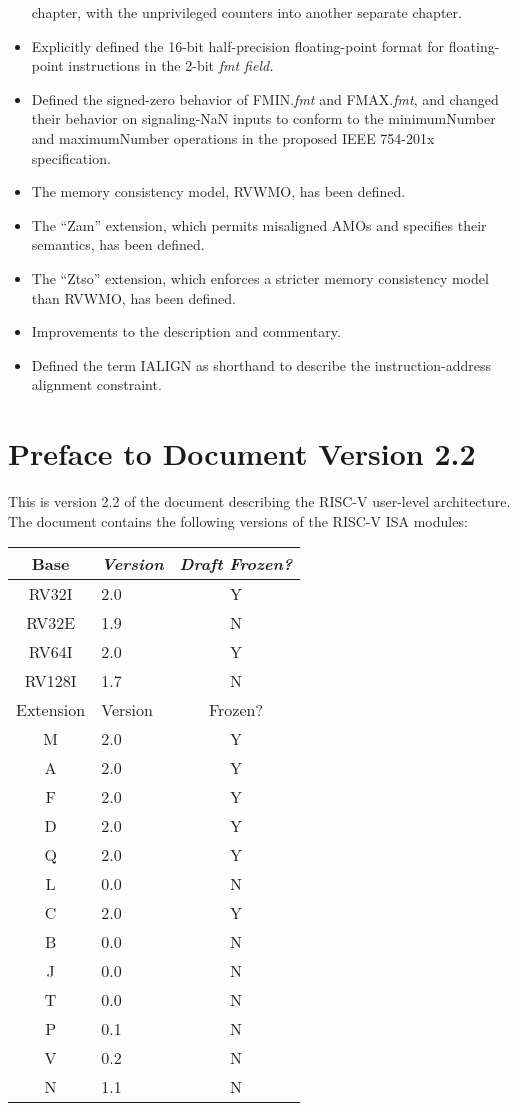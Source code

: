 \begin{itemize}
  chapter, with the unprivileged counters into another separate
  chapter.
\item Explicitly defined the 16-bit half-precision floating-point
  format for floating-point instructions in the 2-bit {\em fmt field.}
\item Defined the signed-zero behavior of FMIN.{\em fmt} and FMAX.{\em fmt},
  and changed their behavior on signaling-NaN inputs to conform to the
  minimumNumber and maximumNumber operations in the proposed IEEE 754-201x
  specification.
\item The memory consistency model, RVWMO, has been defined.
\item The ``Zam'' extension, which permits misaligned AMOs and specifies their semantics, has been defined.
\item The ``Ztso'' extension, which enforces a stricter memory consistency model than RVWMO, has been defined.
\item Improvements to the description and commentary.
\item Defined the term IALIGN as shorthand to describe the instruction-address
  alignment constraint.
\end{itemize}

\section*{Preface to Document Version 2.2}

This is version 2.2 of the document describing the RISC-V
user-level architecture.  The document contains the following
versions of the RISC-V ISA modules:
\begin{table}[hbt]
  \centering
  \begin{tabular}{|c|l|c|}
    \hline
    Base     & \em Version & \em Draft Frozen? \\
    \hline
    RV32I    & 2.0 & Y \\
    RV32E    & 1.9 & N \\
    RV64I    & 2.0 & Y \\
    RV128I   & 1.7 & N \\
    \hline
    Extension & Version & Frozen? \\
    \hline
    M        & 2.0 & Y \\
    A        & 2.0 & Y \\
    F        & 2.0 & Y \\
    D        & 2.0 & Y \\
    Q        & 2.0 & Y \\
    L        & 0.0 & N \\
    C        & 2.0 & Y \\
    B        & 0.0 & N \\
    J        & 0.0 & N \\
    T        & 0.0 & N \\
    P        & 0.1 & N \\
    V        & 0.2 & N \\
    N        & 1.1 & N \\
    \hline
  \end{tabular}
\end{table}

